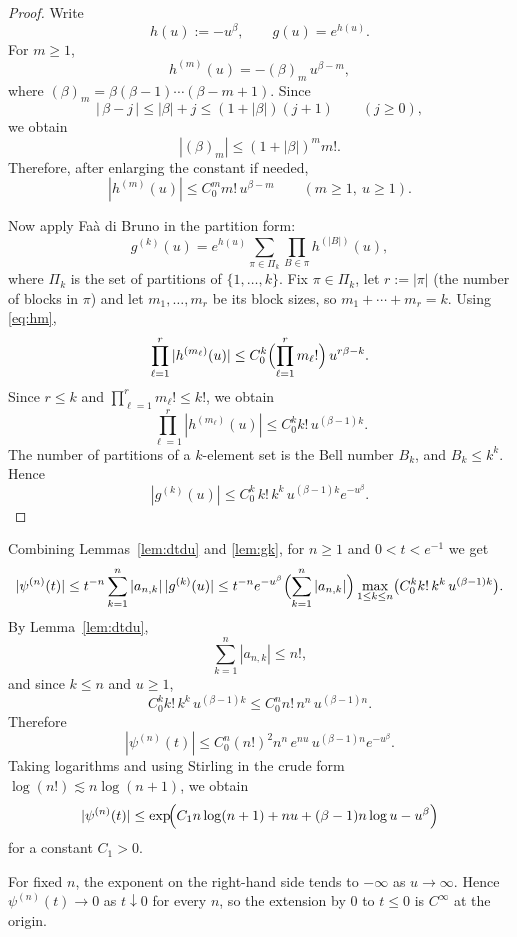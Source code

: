 \documentclass[11pt]{amsart}
\renewcommand{\Pi}{\varPi}
\newcommand{\1}{{\rm 1\hspace*{-0.4ex}%
			\rule{0.1ex}{1.52ex}\hspace*{0.2ex}}}
\numberwithin{equation}{section}
\begin{document}
\begin{proof}
	Write
	\[
	h(u):=-u^\beta,
	\qquad
	g(u)=e^{h(u)}.
	\]
	For $m\ge 1$,
	\[
	h^{(m)}(u)=-(\beta)_m\,u^{\beta-m},
	\]
	where $(\beta)_m=\beta(\beta-1)\cdots (\beta-m+1)$.
	Since
	\[
	|\,\beta-j\,|\le |\beta|+j\le (1+|\beta|)(j+1)
	\qquad (j\ge 0),
	\]
	we obtain
	\[
	|(\beta)_m|
	\le (1+|\beta|)^m m!.
	\]
	Therefore, after enlarging the constant if needed,
	\begin{equation}
		\label{eq:hm}
		|h^{(m)}(u)|\le C_0^m m!\,u^{\beta-m}
		\qquad (m\ge 1,\ u\ge 1).
	\end{equation}
	
	Now apply Fa\`a di Bruno in the partition form:
	\[
	g^{(k)}(u)
	=
	e^{h(u)}
	\sum_{\pi\in \Pi_k}\prod_{B\in\pi} h^{(|B|)}(u),
	\]
	where $\Pi_k$ is the set of partitions of $\{1,\dots,k\}$.
	Fix $\pi\in\Pi_k$, let $r:=|\pi|$ (the number of blocks in $\pi$) and let $m_1,\dots,m_r$ be its block sizes, so
	$m_1+\cdots+m_r=k$.
	Using \eqref{eq:hm},
	\[
	\prod_{\ell=1}^r |h^{(m_\ell)}(u)|
	\le
	C_0^k\Bigl(\prod_{\ell=1}^r m_\ell!\Bigr)\,u^{r\beta-k}.
	\]
	Since $r\le k$ and $\prod_{\ell=1}^r m_\ell!\le k!$, we obtain
	\[
	\prod_{\ell=1}^r |h^{(m_\ell)}(u)|
	\le
	C_0^k k!\,u^{(\beta-1)k}.
	\]
	The number of partitions of a $k$-element set is the Bell number $B_k$, and $B_k\le k^k$.
	Hence
	\[
	|g^{(k)}(u)|
	\le
	C_0^k\,k!\,k^k\,u^{(\beta-1)k}e^{-u^\beta}.
	\]
\end{proof}

Combining Lemmas~\ref{lem:dtdu} and \ref{lem:gk}, for $n\ge 1$ and $0<t<e^{-1}$ we get
\[
|\psi^{(n)}(t)|
\le
t^{-n}\sum_{k=1}^n |a_{n,k}|\,|g^{(k)}(u)|
\le
t^{-n} e^{-u^\beta}\Bigl(\sum_{k=1}^n |a_{n,k}|\Bigr)
\max_{1\le k\le n}\bigl(C_0^k k!\,k^k\,u^{(\beta-1)k}\bigr).
\]
By Lemma~\ref{lem:dtdu},
\[
\sum_{k=1}^n|a_{n,k}|\le n!,
\]
and since $k\le n$ and $u\ge 1$,
\[
C_0^k k!\,k^k\,u^{(\beta-1)k}
\le
C_0^n n!\,n^n\,u^{(\beta-1)n}.
\]
Therefore
\[
|\psi^{(n)}(t)|
\le
C_0^n (n!)^2 n^n\,e^{nu}\,u^{(\beta-1)n}e^{-u^\beta}.
\]
Taking logarithms and using Stirling in the crude form $\log(n!)\lesssim n\log(n+1)$,
we obtain
\begin{equation}
	\label{eq:rough-bound}
	|\psi^{(n)}(t)|
	\le
	\exp\!\Bigl(C_1 n\log(n+1)+nu+(\beta-1)n\log u-u^\beta\Bigr)
\end{equation}
for a constant $C_1>0$.

For fixed $n$, the exponent on the right-hand side tends to $-\infty$ as $u\to\infty$.
Hence $\psi^{(n)}(t)\to 0$ as $t\downarrow 0$ for every $n$, so the extension by $0$ to
$t\le 0$ is $C^\infty$ at the origin.
\end{document}
